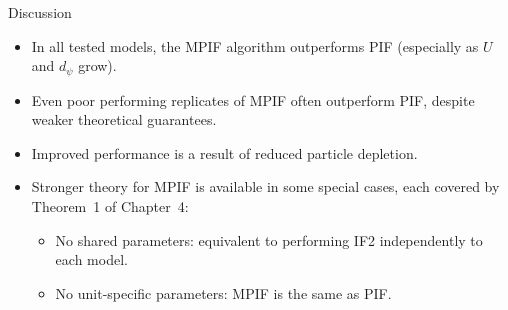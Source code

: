 \documentclass[aspectratio=169]{beamer}\usepackage[]{graphicx}\usepackage[]{xcolor}
\begin{document}
\begin{frame}{Discussion}
  \begin{itemize}
    \item In all tested models, the MPIF algorithm outperforms PIF (especially as $U$ and $d_\psi$ grow).
    \item Even poor performing replicates of MPIF often outperform PIF, despite weaker theoretical guarantees.
    \item Improved performance is a result of reduced particle depletion.
    \item Stronger theory for MPIF is available in some special cases, each covered by Theorem~1 of Chapter~4:
    \begin{itemize}
      \item No shared parameters: equivalent to performing IF2 independently to each model. 
      \item No unit-specific parameters: MPIF is the same as PIF.
    \end{itemize}
  \end{itemize}
\end{frame}
\end{document}
